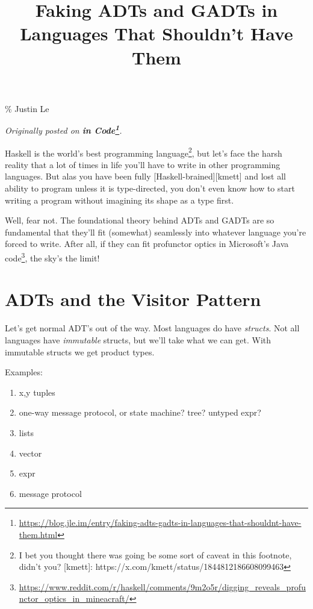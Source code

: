 \documentclass[]{article}
\title{Faking ADTs and GADTs in Languages That Shouldn't Have Them}
\renewcommand{\href}[2]{#2\footnote{\url{#1}}}
\begin{document}
\maketitle

\% Justin Le

\emph{Originally posted on
\textbf{\href{https://blog.jle.im/entry/faking-adts-gadts-in-languages-that-shouldnt-have-them.html}{in
Code}}.}

Haskell is the world's best programming language\footnote{I bet you thought
  there was going be some sort of caveat in this footnote, didn't you?
  {[}kmett{]}: https://x.com/kmett/status/1844812186608099463}, but let's face
the harsh reality that a lot of times in life you'll have to write in other
programming languages. But alas you have been fully
{[}Haskell-brained{]}{[}kmett{]} and lost all ability to program unless it is
type-directed, you don't even know how to start writing a program without
imagining its shape as a type first.

Well, fear not. The foundational theory behind ADTs and GADTs are so fundamental
that they'll fit (somewhat) seamlessly into whatever language you're forced to
write. After all, if they can fit
\href{https://www.reddit.com/r/haskell/comments/9m2o5r/digging_reveals_profunctor_optics_in_mineacraft/}{profunctor
optics in Microsoft's Java code}, the sky's the limit!

\section{ADTs and the Visitor Pattern}\label{adts-and-the-visitor-pattern}

Let's get normal ADT's out of the way. Most languages do have \emph{structs}.
Not all languages have \emph{immutable} structs, but we'll take what we can get.
With immutable structs we get product types.

Examples:

\begin{enumerate}
\def\labelenumi{\arabic{enumi}.}
\tightlist
\item
  x,y tuples
\item
  one-way message protocol, or state machine? tree? untyped expr?
\item
  lists
\item
  vector
\item
  expr
\item
  message protocol
\end{enumerate}
\end{document}
